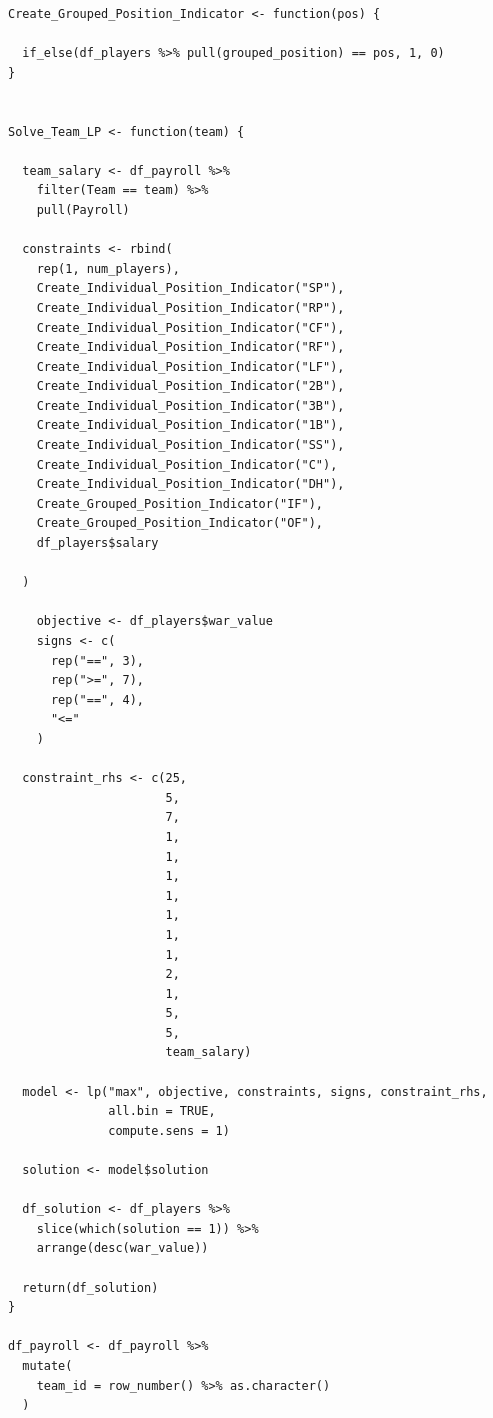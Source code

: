 \documentclass{article}
\begin{document}
\begin{singlespace}
\begin{verbatim}
Create_Grouped_Position_Indicator <- function(pos) {
  
  if_else(df_players %>% pull(grouped_position) == pos, 1, 0)
}


Solve_Team_LP <- function(team) {
  
  team_salary <- df_payroll %>% 
    filter(Team == team) %>% 
    pull(Payroll)
  
  constraints <- rbind(
    rep(1, num_players),
    Create_Individual_Position_Indicator("SP"),
    Create_Individual_Position_Indicator("RP"),
    Create_Individual_Position_Indicator("CF"),
    Create_Individual_Position_Indicator("RF"),
    Create_Individual_Position_Indicator("LF"),
    Create_Individual_Position_Indicator("2B"),
    Create_Individual_Position_Indicator("3B"),
    Create_Individual_Position_Indicator("1B"),
    Create_Individual_Position_Indicator("SS"),
    Create_Individual_Position_Indicator("C"),
    Create_Individual_Position_Indicator("DH"),
    Create_Grouped_Position_Indicator("IF"),
    Create_Grouped_Position_Indicator("OF"),
    df_players$salary
    
  )
  
    objective <- df_players$war_value
    signs <- c(
      rep("==", 3),
      rep(">=", 7),
      rep("==", 4),
      "<="
    )
  
  constraint_rhs <- c(25, 
                      5,
                      7,
                      1,
                      1,
                      1,
                      1,
                      1,
                      1,
                      1,
                      2,
                      1,
                      5,
                      5,
                      team_salary)
  
  model <- lp("max", objective, constraints, signs, constraint_rhs, 
              all.bin = TRUE,
              compute.sens = 1)
  
  solution <- model$solution
  
  df_solution <- df_players %>% 
    slice(which(solution == 1)) %>% 
    arrange(desc(war_value))
  
  return(df_solution)
}

df_payroll <- df_payroll %>% 
  mutate(
    team_id = row_number() %>% as.character()
  )


\end{verbatim}
\end{singlespace}
\end{document}
